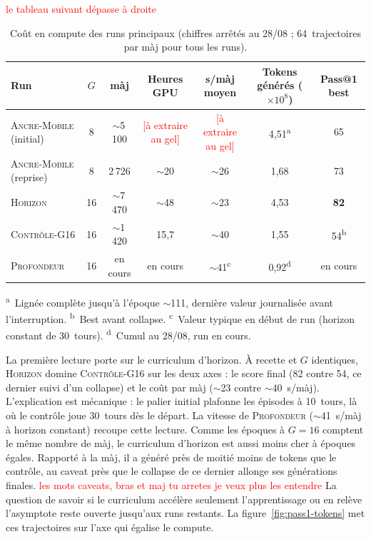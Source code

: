 \documentclass[11pt,a4paper]{article}
\begin{document}
\textcolor{red}{le tableau suivant dépasse à droite} 
\begin{table}[htbp]
\centering
\caption{Coût en compute des runs principaux (chiffres arrêtés au 28/08 ; 64~trajectoires par màj pour tous les runs).}
\label{tab:compute}
\begin{tabular}{lcccccc}
\toprule
Run & $G$ & màj & Heures GPU & s/màj moyen & Tokens générés ($\times 10^8$) & Pass@1 best \\
\midrule
\textsc{Ancre-Mobile} (initial) & 8 & $\sim$5\,100 & \textcolor{red}{[à extraire au gel]} & \textcolor{red}{[à extraire au gel]} & 4{,}51\textsuperscript{a} & 65 \\
\textsc{Ancre-Mobile} (reprise) & 8 & 2\,726 & $\sim$20 & $\sim$26 & 1{,}68 & 73 \\
\textsc{Horizon} & 16 & $\sim$7\,470 & $\sim$48 & $\sim$23 & 4{,}53 & \textbf{82} \\
\textsc{Contrôle-G16} & 16 & $\sim$1\,420 & 15{,}7 & $\sim$40 & 1{,}55 & 54\textsuperscript{b} \\
\textsc{Profondeur} & 16 & en cours & en cours & $\sim$41\textsuperscript{c} & 0{,}92\textsuperscript{d} & en cours \\
\bottomrule
\end{tabular}

\smallskip
{\footnotesize \textsuperscript{a}~Lignée complète jusqu'à l'époque $\sim$111, dernière valeur journalisée avant l'interruption. \textsuperscript{b}~Best avant collapse. \textsuperscript{c}~Valeur typique en début de run (horizon constant de 30~tours). \textsuperscript{d}~Cumul au 28/08, run en cours.}
\end{table}

La première lecture porte sur le curriculum d'horizon. À recette et $G$ identiques, \textsc{Horizon} domine \textsc{Contrôle-G16} sur les deux axes : le score final (82 contre 54, ce dernier suivi d'un collapse) et le coût par màj ($\sim$23 contre $\sim$40~s/màj). L'explication est mécanique : le palier initial plafonne les épisodes à 10~tours, là où le contrôle joue 30~tours dès le départ. La vitesse de \textsc{Profondeur} ($\sim$41~s/màj à horizon constant) recoupe cette lecture. Comme les époques à $G=16$ comptent le même nombre de màj, le curriculum d'horizon est aussi moins cher à époques égales. Rapporté à la màj, il a généré près de moitié moins de tokens que le contrôle, au caveat près que le collapse de ce dernier allonge ses générations finales. \textcolor{red}{les mots caveats, bras et maj tu arretes je veux plus les entendre} La question de savoir si le curriculum accélère seulement l'apprentissage ou en relève l'asymptote reste ouverte jusqu'aux runs restants. La figure~\ref{fig:pass1-tokens} met ces trajectoires sur l'axe qui égalise le compute.
\end{document}
